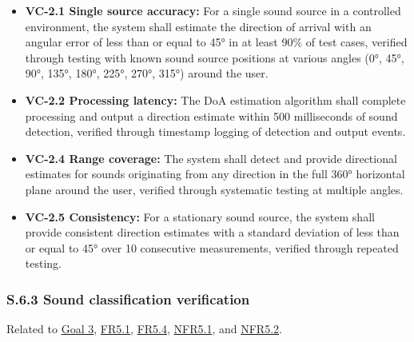 \documentclass[12pt]{article}
\theoremstyle{definition}
\begin{document}
\begin{itemize}
\item \textbf{VC-2.1 Single source accuracy:} For a single sound source in 
a controlled environment, the system shall estimate the direction of arrival 
with an angular error of less than or equal to 45° in at least 90\% of 
test cases, verified 
through testing with known sound source positions at various angles (0°, 45°, 
90°, 135°, 180°, 225°, 270°, 315°) around the user.

\item \textbf{VC-2.2 Processing latency:} The DoA estimation algorithm shall 
complete processing and output a direction estimate within 500 milliseconds 
of sound detection, verified through timestamp logging of detection and 
output events.

\item \textbf{VC-2.4 Range coverage:} The system shall detect and provide 
directional estimates for sounds originating from any direction in the full 
360° horizontal plane around the user, verified through systematic testing 
at multiple angles.

\item \textbf{VC-2.5 Consistency:} For a stationary sound source, the system 
shall provide consistent direction estimates with a standard deviation of 
less than or equal to 45° over 10 consecutive measurements, 
verified through repeated testing.
\end{itemize}

\subsubsection{S.6.3 Sound classification verification}

Related to \hyperref[goal:audio_identification_analysis]{Goal 3}, 
\hyperref[FR5_1]{FR5.1}, \hyperref[FR5_4]{FR5.4}, 
\hyperref[NFR5_1]{NFR5.1}, and \hyperref[NFR5_2]{NFR5.2}.
\end{document}
